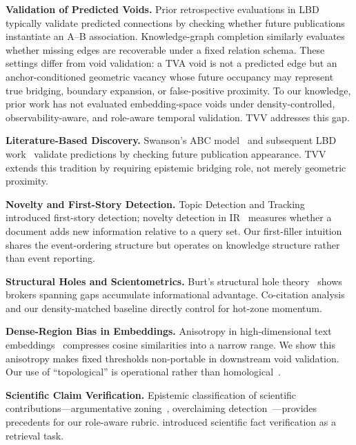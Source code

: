 \documentclass[11pt,twocolumn]{article}
\newcommand{\tva}{\textsf{TVA}}
\newcommand{\tvv}{\textsf{TVV}}
\begin{document}
\textbf{Validation of Predicted Voids.}
Prior retrospective evaluations in LBD~\cite{swanson1986fish,gordon1996using,weeber2001using}
typically validate predicted connections by checking whether future publications instantiate
an A--B association. Knowledge-graph completion similarly evaluates whether missing edges
are recoverable under a fixed relation schema. These settings differ from void validation:
a \tva{} void is not a predicted edge but an anchor-conditioned geometric vacancy whose
future occupancy may represent true bridging, boundary expansion, or false-positive
proximity. To our knowledge, prior work has not evaluated embedding-space voids under
density-controlled, observability-aware, and role-aware temporal validation. \tvv{}
addresses this gap.

\textbf{Literature-Based Discovery.}
Swanson's ABC model~\cite{swanson1986fish} and subsequent LBD work~\cite{gordon1996using,weeber2001using} validate predictions by checking future
publication appearance. \tvv{} extends this tradition by requiring epistemic bridging
role, not merely geometric proximity.

\textbf{Novelty and First-Story Detection.}
Topic Detection and Tracking~\cite{allan1998topic} introduced first-story detection; novelty detection in IR~\cite{zhang2002novelty}
measures whether a document adds new information relative to a query set. Our
first-filler intuition shares the event-ordering structure but operates on knowledge
structure rather than event reporting.

\textbf{Structural Holes and Scientometrics.}
Burt's structural hole theory~\cite{burt2004structural} shows brokers spanning gaps accumulate informational
advantage. Co-citation analysis~\cite{small1973cocitation} and our density-matched baseline directly control for hot-zone momentum.

\textbf{Dense-Region Bias in Embeddings.}
Anisotropy in high-dimensional text embeddings~\cite{ethayarajh2019contextual} compresses cosine similarities into a
narrow range. We show this anisotropy makes fixed thresholds non-portable in
downstream void validation. Our use of ``topological'' is operational rather than
homological~\cite{carlsson2009topology,edelsbrunner2010computational}.

\textbf{Scientific Claim Verification.}
Epistemic classification of scientific contributions---argumentative zoning~\cite{teufel2002summarizing},
overclaiming detection~\cite{wright2022generating}---provides precedents for our role-aware rubric. \cite{wadden2020scifact} introduced scientific fact verification as a retrieval task.
\end{document}
